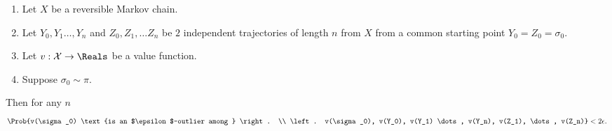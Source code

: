 \documentclass[12pt]{article}
\begin{document}
\begin{theorem}
    \label{thm:parallelsignificance:twoepstest}
    \begin{enumerate}
        \item
            Let \( X \) be a reversible Markov chain.
        \item
            Let \( Y_0, Y_1 \dots, Y_n \) and \( Z_0, Z_1, \dots Z_n \)
            be \( 2 \) independent trajectories of length \( n \) from \(
            X \) from a common starting point \( Y_0 = Z_0 = \sigma_0 \).
        \item
            Let \( v :  \mathcal{X} \to \Reals \) be a value function.
        \item
            Suppose \( \sigma_0 \sim \pi \).
    \end{enumerate}
    Then for any \( n \)
    \begin{multline*}
      \Prob{v(\sigma_0) \text{is an $\epsilon$-outlier among }
      \right. \\
      \left.   v(\sigma_0),
        v(Y_0), v(Y_1) \dots, v(Y_n), v(Z_1), \dots, v(Z_n)} < 2
        \epsilon.
    \end{multline*}

\end{theorem}
\end{document}
